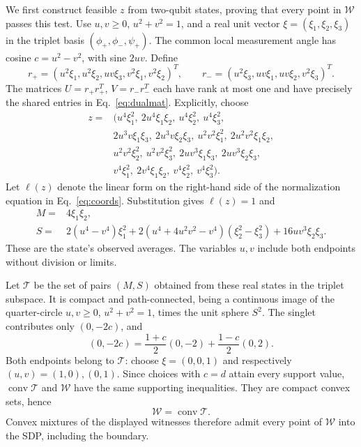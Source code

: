 \documentclass[11pt]{article}
\theoremstyle{remark}\newtheorem{remark}[theorem]{Remark}
\newcommand{\W}{\mathcal W}\newcommand{\sxdeg}{\operatorname{sxdeg}}
\begin{document}
We first construct feasible $z$ from two-qubit states, proving that every
point in $\W$ passes this test.
Use $u,v\ge0$, $u^2+v^2=1$, and a real unit vector
$\xi=(\xi_1,\xi_2,\xi_3)$ in the triplet basis
$(\phi_+,\phi_-,\psi_+)$. The common local measurement angle has cosine $c=u^2-v^2$,
with sine $2uv$. Define
\[
 r_+=(u^2\xi_1,u^2\xi_2,uv\xi_3,v^2\xi_1,v^2\xi_2)^T,\qquad
 r_-=(u^2\xi_3,uv\xi_1,uv\xi_2,v^2\xi_3)^T.
\]
The matrices $U=r_+r_+^T$, $V=r_-r_-^T$ each have rank at most one and
have precisely the shared entries in Eq.~\eqref{eq:dualmat}. Explicitly, choose
\begin{equation}
\begin{split}
 z={}&(u^4\xi_1^2,\ 2u^4\xi_1\xi_2,\ u^4\xi_2^2,\ u^4\xi_3^2,\\
 &2u^3v\xi_1\xi_3,\ 2u^3v\xi_2\xi_3,\ u^2v^2\xi_1^2,
   \ 2u^2v^2\xi_1\xi_2,\\
 &u^2v^2\xi_2^2,\ u^2v^2\xi_3^2,\ 2uv^3\xi_1\xi_3,
   \ 2uv^3\xi_2\xi_3,\\
 &v^4\xi_1^2,\ 2v^4\xi_1\xi_2,\ v^4\xi_2^2,\ v^4\xi_3^2).
\end{split}
\label{eq:statewitness}
\end{equation}
Let $\ell(z)$ denote the linear form on the right-hand side of the
normalization equation in Eq.~\eqref{eq:coords}. Substitution gives $\ell(z)=1$ and
\begin{align*}
 M={}&4\xi_1\xi_2,\\
 S={}&2(u^4-v^4)\xi_1^2
 +2(u^4+4u^2v^2-v^4)(\xi_2^2-\xi_3^2)
 +16uv^3\xi_2\xi_3.
\end{align*}
These are the state's observed averages. The variables $u,v$ include
both endpoints without division or limits.

Let $\mathcal T$ be the set of pairs $(M,S)$ obtained from these real states
in the triplet subspace. It is compact and path-connected, being a continuous
image of the quarter-circle $u,v\ge0$, $u^2+v^2=1$, times the unit sphere $S^2$.
The singlet contributes only $(0,-2c)$, and
\[
 (0,-2c)=\frac{1+c}{2}(0,-2)+\frac{1-c}{2}(0,2).
\]
Both endpoints belong to $\mathcal T$: choose $\xi=(0,0,1)$ and
respectively $(u,v)=(1,0),(0,1)$. Since choices with $c=d$ attain every
support value, $\operatorname{conv}\mathcal T$ and $\W$ have the same
supporting inequalities. They are compact convex sets, hence
\begin{equation}
 \W=\operatorname{conv}\mathcal T.
 \label{eq:triplet-hull}
\end{equation}
Convex mixtures of the displayed witnesses therefore admit every point of
$\W$ into the SDP, including the boundary.
\end{document}
